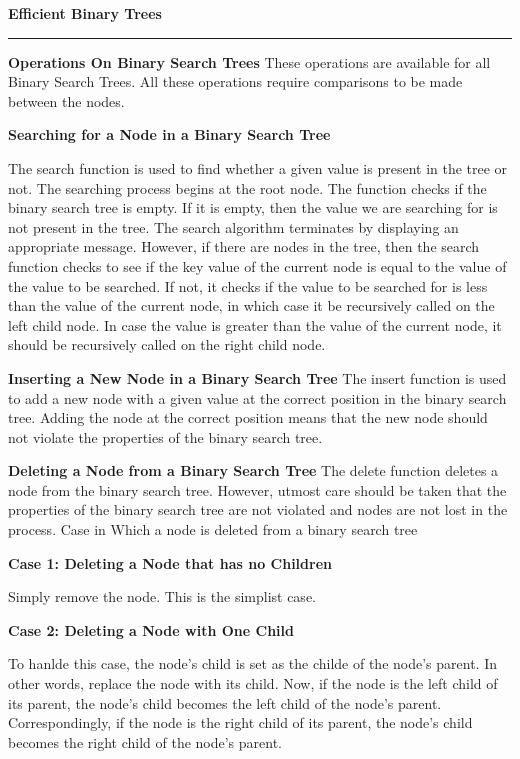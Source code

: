 {\bf Efficient Binary Trees}
\vskip 1mm
\hrule

\vskip 3mm
{\bf Operations On Binary Search Trees}
\vskip 1mm
These operations are available for all Binary Search Trees. All these operations require comparisons to be made between the nodes.

\vskip 1cm
{\bf Searching for a Node in a Binary Search Tree}

\vskip 1mm
The search function is used to find whether a given value is present in the tree or not. The searching process begins at the root node. The function checks if the binary search tree is empty. If it is empty, then the value we are searching for is not present in the tree. The search algorithm terminates by displaying an appropriate message. However, if there are nodes in the tree, then the search function checks to see if the key value of the current node is equal to the value of the value to be searched. If not, it checks if the value to be searched for is less than the value of the current node, in which case it be recursively called on the left child node. In case the value is greater than the value of the current node, it should be recursively called on the right child node.

\filbreak
\vskip 1cm
{\bf Inserting a New Node in a Binary Search Tree}
\vskip 1mm
The insert function is used to add a new node with a given value at the correct position in the binary search tree. Adding the node at the correct position means that the new node should not violate the properties of the binary search tree.

\filbreak
\vskip 1cm
{\bf Deleting a Node from a Binary Search Tree}
\vskip 1mm
The delete function deletes a node from the binary search tree. However, utmost care should be taken that the properties of the binary search tree are not violated and nodes are not lost in the process.
Case in Which a node is deleted from a binary search tree

\vskip 3mm
{\bf Case 1: Deleting a Node that has no Children}

\vskip 1mm
Simply remove the node. This is the simplist case.

\vskip 2mm
{\bf Case 2: Deleting a Node with One Child}

\vskip 1mm
To hanlde this case, the node's child is set as the childe of the node's parent. In other words,  replace the node with its child. Now, if the node is the left child of its parent, the node's child becomes the left child of the node's parent. Correspondingly, if the node is the right child of its parent, the node's child becomes the right child of the node's parent.

